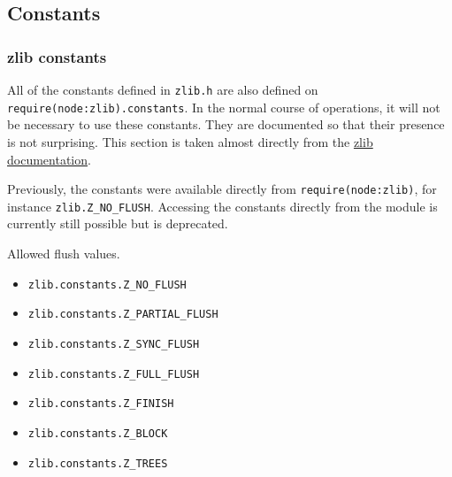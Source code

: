 \begin{Shaded}
\begin{Highlighting}[]
\OperatorTok{=} \NormalTok{(() }\KeywordTok{=\textgreater{}}\NormalTok{ \{}
\NormalTok{(}\SpecialCharTok{$\{}\NormalTok{()}\VerbatimStringTok{\textasciigrave{}}\OperatorTok{,}\NormalTok{ () }\KeywordTok{=\textgreater{}}\NormalTok{ \{}
\NormalTok{()}\OperatorTok{;}
\NormalTok{    \})}\OperatorTok{;}
\NormalTok{  \}}\OperatorTok{,} \NormalTok{)}\OperatorTok{;}
\NormalTok{\})}\NormalTok{(}\NormalTok{)}\OperatorTok{;}
\end{Highlighting}
\end{Shaded}

\subsection{Constants}\label{constants}

\subsubsection{zlib constants}\label{zlib-constants}

All of the constants defined in \texttt{zlib.h} are also defined on
\texttt{require(\textquotesingle{}node:zlib\textquotesingle{}).constants}.
In the normal course of operations, it will not be necessary to use
these constants. They are documented so that their presence is not
surprising. This section is taken almost directly from the
\href{https://zlib.net/manual.html\#Constants}{zlib documentation}.

Previously, the constants were available directly from
\texttt{require(\textquotesingle{}node:zlib\textquotesingle{})}, for
instance \texttt{zlib.Z\_NO\_FLUSH}. Accessing the constants directly
from the module is currently still possible but is deprecated.

Allowed flush values.

\begin{itemize}
\tightlist
\item
  \texttt{zlib.constants.Z\_NO\_FLUSH}
\item
  \texttt{zlib.constants.Z\_PARTIAL\_FLUSH}
\item
  \texttt{zlib.constants.Z\_SYNC\_FLUSH}
\item
  \texttt{zlib.constants.Z\_FULL\_FLUSH}
\item
  \texttt{zlib.constants.Z\_FINISH}
\item
  \texttt{zlib.constants.Z\_BLOCK}
\item
  \texttt{zlib.constants.Z\_TREES}
\end{itemize}

